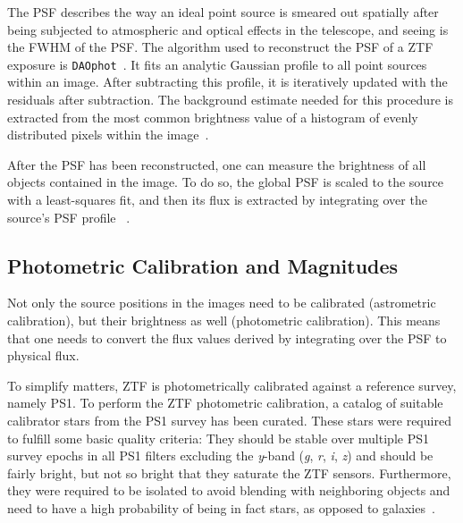 The PSF describes the way an ideal point source is smeared out spatially after being subjected to atmospheric and optical effects in the telescope, and seeing is the FWHM of the PSF. The algorithm used to reconstruct the PSF of a ZTF exposure is \texttt{DAOphot}~. It fits an analytic Gaussian profile to all point sources within an image. After subtracting this profile, it is iteratively updated with the residuals after subtraction. The background estimate needed for this procedure is extracted from the most common brightness value of a histogram of evenly distributed pixels within the image~\cite{Stetson1987}.

After the PSF has been reconstructed, one can measure the brightness of all objects contained in the image. To do so, the global PSF is scaled to the source with a least-squares fit, and then its flux is extracted by integrating over the source's PSF profile ~\cite{Stetson1987}.

\subsection{Photometric Calibration and Magnitudes}\label{magnitudes}

Not only the source positions in the images need to be calibrated (astrometric calibration), but their brightness as well (photometric calibration). This means that one needs to convert the flux values derived by integrating over the PSF to physical flux.

To simplify matters, ZTF is photometrically calibrated against a reference survey, namely PS1. To perform the ZTF photometric calibration, a catalog of suitable calibrator stars from the PS1 survey has been curated. These stars were required to fulfill some basic quality criteria: They should be stable over multiple PS1 survey epochs in all PS1 filters excluding the \textit{y}-band (\textit{g}, \textit{r}, \textit{i}, \textit{z}) and should be fairly bright, but not so bright that they saturate the ZTF sensors. Furthermore, they were required to be isolated to avoid blending with neighboring objects and need to have a high probability of being in fact stars, as opposed to galaxies~\cite{Masci2019a}.

